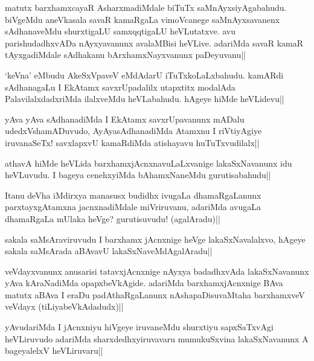 \begin{artha}%
matutx barxhamxcayaR AsharxmadiMdale biTuTx saMnAyxsiyAgabahudu. biVgeMdu aneVkasala savaR kamaRgaLa vimoVcanege saMnAyxsavanenx sAdhanaveMdu shurxtigaLU samxqqtigaLU heVLutatxve. avu parishudadhxvADa nAyxyavanunx avalaMBisi heVLive. adariMda savaR kamaR tAyxgadiMdale sAdhakanu bArxhamxNayxvanunx paDeyuvanu||
\end{artha}

\begin{artha}
`keVna' eMbudu AkeSxVpaveV eMdAdarU iTuTxkoLaLxbahudu. kamARdi sAdhanagaLu I EkAtamx savxrUpadalilx utapxtitx modalAda PalavilalxdadxriMda ilalxveMdu heVLabahudu. hAgeye hiMde heVLidevu||
\end{artha}


\begin{artha}
yAva yAva sAdhanadiMda I EkAtamx savxrUpavanunx mADalu udedxVshamADuvudo, AyAyasAdhanadiMda Atamxnu I riVtiyAgiye iruvanaSeTx! savxlapxvU kamaRdiMda atishayavu huTuTxvudilalx||
\end{artha}

\begin{artha}%
athavA hiMde heVLida barxhamxjAcnxnavuLaLxvanige lakaSxNavanunx idu heVLuvudu. I bageya cenehxyiMda bAhamxNaneMdu gurutisabahudu||
\end{artha}

\begin{artha}
Itanu deVha iMdirxya manasusx budidhx ivugaLa dhamaRgaLanunx parxtayxgAtamxna jacnxnadiMdale miVriruvanu, adariMda avugaLa dhamaRgaLa mUlaka heVge? gurutisuvudu! (agalAradu)||
\end{artha}

\begin{artha}
sakala saMsAraviruvudu I barxhamx jAcnxnige heVge lakaSxNavalalxvo, hAgeye sakala saMsArada aBAvavU lakaSxNaveMdAgalAradu||
\end{artha}


\begin{artha}
veVdayxvanunx anusarisi tatavxjAcnxnige nAyxya badadhxvAda lakaSxNavanunx yAva kAraNadiMda opapxbeVkAgide. adariMda barxhamxjAcnxnige BAva matutx aBAva I eraDu padAthaRgaLanunx nAshapaDisuvaMtaha barxhamxveV veVdayx (tiLiyabeVkAdadudx)||
\end{artha}

\begin{artha}
yAvudariMda I jAcnxniyu hiVgeye iruvaneMdu shurxtiyu sapxSaTxvAgi heVLiruvudo adariMda sharxdedhxyiruvavaru mumukuSxvina lakaSxNavanunx A bageyalelxV heVLiruvaru||
\end{artha}%
